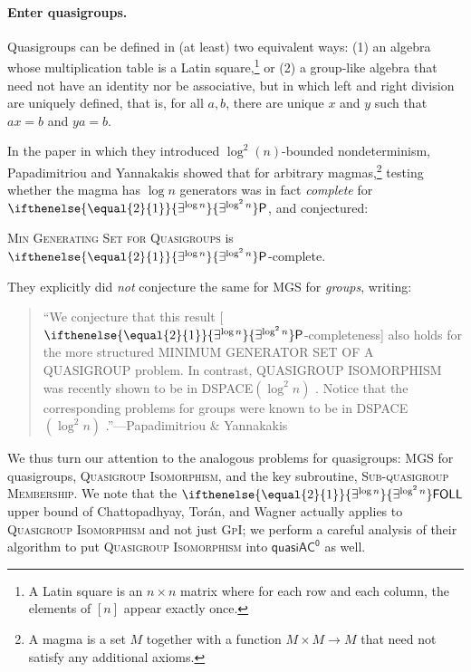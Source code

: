 \documentclass{theoretics}
\newcommand{\algprobm}[1]{\textsc{#1}\xspace}
\newcommand{\betacc}[1]{\ifthenelse{\equal{#1}{1}}{\exists^{\log n}}{\exists^{\log^{#1}n}}} %
\newcommand*{\ComplexityClass}[1]{\ensuremath{\mathsf{#1}}\xspace}
\renewcommand{\P}{\ComplexityClass{P}}
\newcommand{\qACz}{\ComplexityClass{quasiAC^0}}
\newcommand{\FOLL}{\ComplexityClass{FOLL}}
\begin{document}
\paragraph{Enter quasigroups.} Quasigroups can be defined in (at least) two equivalent ways: (1) an algebra whose multiplication table is a Latin square,\footnote{A Latin square is an $n \times n$ matrix where for each row and each column, the elements of $[n]$ appear exactly once.} or (2) a group-like algebra that need not have an identity nor be associative, but in which left and right division are uniquely defined, that is, for all $a,b$, there are unique $x$ and $y$ such that $ax=b$ and $ya=b$. 

In the paper in which they introduced $\log^2(n)$-bounded nondeterminism, Papadimitriou and Yannakakis showed that for arbitrary magmas,\footnote{A magma is a set $M$ together with a function $M \times M \to M$ that need not satisfy any additional axioms.} testing whether the magma has $\log n$ generators was in fact \emph{complete} for $\betacc{2} \P$, and conjectured:

\begin{conjecture} \label{conj:PY}
\algprobm{Min Generating Set for Quasigroups} is $\betacc{2}\P$-complete.
\end{conjecture}

\noindent They explicitly did \emph{not} conjecture the same for \algprobm{MGS} for \emph{groups}, writing:

\begin{quotation}
\noindent ``We conjecture that this result [$\betacc{2}\P$-completeness] also holds for the more structured MINIMUM GENERATOR SET OF A QUASIGROUP problem. In contrast, QUASIGROUP ISOMORPHISM was recently shown to be in DSPACE$(\log^2 n)$ \cite{Wolf}. Notice that the corresponding problems for groups were known to be in DSPACE$(\log^2 n)$ \cite{LiptonSnyderZalcstein}.''---Papadimitriou \& Yannakakis \cite[p.~169]{PY}
\end{quotation}

\noindent We thus turn our attention to the analogous problems for quasigroups: \algprobm{MGS} for quasigroups, \algprobm{Quasigroup Isomorphism}, and the key subroutine, \algprobm{Sub-quasigroup Membership}. We note that the $\betacc{2}\FOLL$ upper bound of Chattopadhyay, Torán, and Wagner \cite{ChattopadhyayToranWagner} actually applies to \algprobm{Quasigroup Isomorphism} and not just \algprobm{GpI}; we perform a careful analysis of their algorithm to put \algprobm{Quasigroup Isomorphism} into $\qACz$ as well. 
\end{document}
